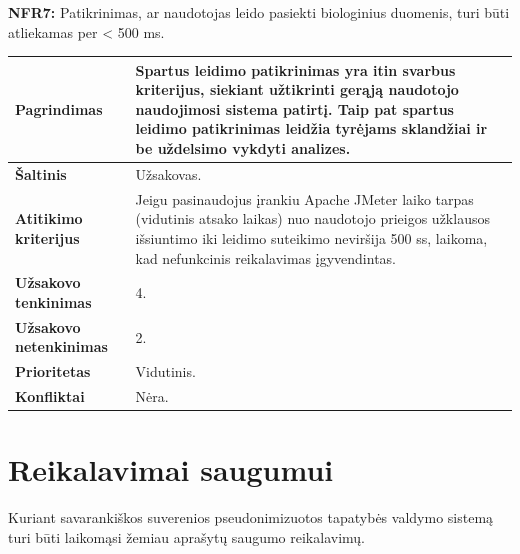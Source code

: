 \documentclass[12pt]{article}
\begin{document}
\noindent \textbf{NFR7:} Patikrinimas, ar naudotojas leido pasiekti biologinius
duomenis, turi būti atliekamas per < 500 ms.
\label{sec:NFR7}
\begin{table}[htb!]
    \captionsetup{justification=centering}
    \vskip -10pt
    \begin{tabular}{|m{4.9cm}|m{11cm}|}
        \hline
        \raggedleft \textbf{\cellcolor{deepchampagne}Pagrindimas} &
        Spartus leidimo patikrinimas yra itin svarbus kriterijus, siekiant
        užtikrinti gerąją naudotojo naudojimosi sistema patirtį. Taip pat
        spartus leidimo patikrinimas leidžia tyrėjams sklandžiai ir be uždelsimo
        vykdyti analizes. \\
        \hline
        \raggedleft \textbf{\cellcolor{deepchampagne}Šaltinis} & Užsakovas. \\
        \hline
        \raggedleft \textbf{\cellcolor{deepchampagne}Atitikimo kriterijus} & 
        Jeigu pasinaudojus įrankiu Apache JMeter laiko tarpas (vidutinis atsako
        laikas) nuo naudotojo prieigos užklausos išsiuntimo iki leidimo
        suteikimo neviršija 500 ss, laikoma, kad nefunkcinis reikalavimas
        įgyvendintas. \\
        \hline
        \raggedleft \textbf{\cellcolor{deepchampagne}Užsakovo tenkinimas} & 4. \\
        \hline
        \raggedleft \textbf{\cellcolor{deepchampagne}Užsakovo netenkinimas} & 2. \\
        \hline
        \raggedleft \textbf{\cellcolor{deepchampagne}Prioritetas} & Vidutinis. \\
        \hline
        \raggedleft \textbf{\cellcolor{deepchampagne}Konfliktai} & Nėra. \\
        \hline
    \end{tabular}
\end{table}

\newpage

\section{Reikalavimai saugumui}
Kuriant savarankiškos suverenios pseudonimizuotos tapatybės valdymo sistemą
turi būti laikomąsi žemiau aprašytų saugumo reikalavimų.
\vskip 10pt
\end{document}
